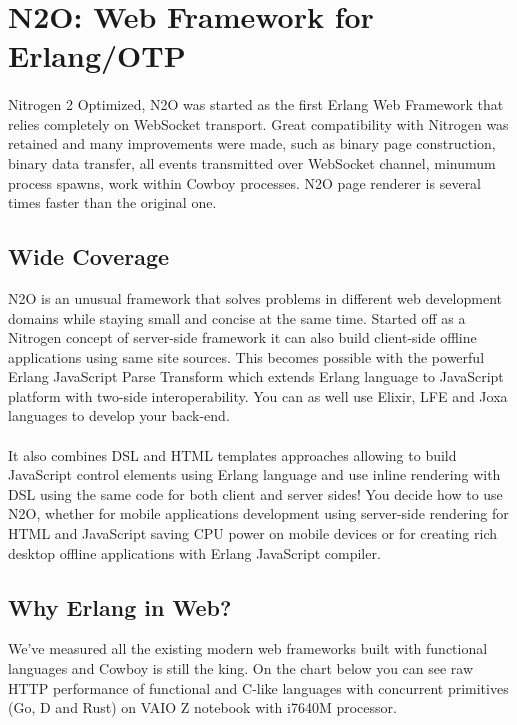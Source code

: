 \section{N2O: Web Framework for Erlang/OTP}

\paragraph{}
Nitrogen 2 Optimized, N2O was started as the first Erlang Web Framework
that relies completely on WebSocket transport. Great compatibility with Nitrogen
was retained and many improvements were made, such as binary page construction,
binary data transfer, all events transmitted over WebSocket channel, minumum process spawns,
work within Cowboy processes. N2O page renderer is several times faster
than the original one.

\subsection{Wide Coverage}
N2O is an unusual framework that solves problems in different web development domains
while staying small and concise at the same time. Started off as a Nitrogen concept
of server-side framework it can also build client-side offline applications
using same site sources. This becomes possible with the powerful Erlang JavaScript Parse
Transform which extends Erlang language to JavaScript platform with two-side
interoperability. You can as well use Elixir, LFE and Joxa languages to develop
your back-end.

\paragraph{}
It also combines DSL and HTML templates approaches allowing to build JavaScript
control elements using Erlang language and use inline rendering with DSL using
the same code for both client and server sides!
You decide how to use N2O, whether for mobile applications development using server-side rendering
for HTML and JavaScript saving CPU power on mobile devices or for creating rich desktop
offline applications with Erlang JavaScript compiler.

\newpage
\subsection*{Why Erlang in Web?}
We've measured all the existing modern web frameworks built with functional
languages and Cowboy is still the king. On the chart below you can see raw HTTP
performance of functional and C-like languages with concurrent
primitives (Go, D and Rust) on VAIO Z notebook with i7640M processor.

